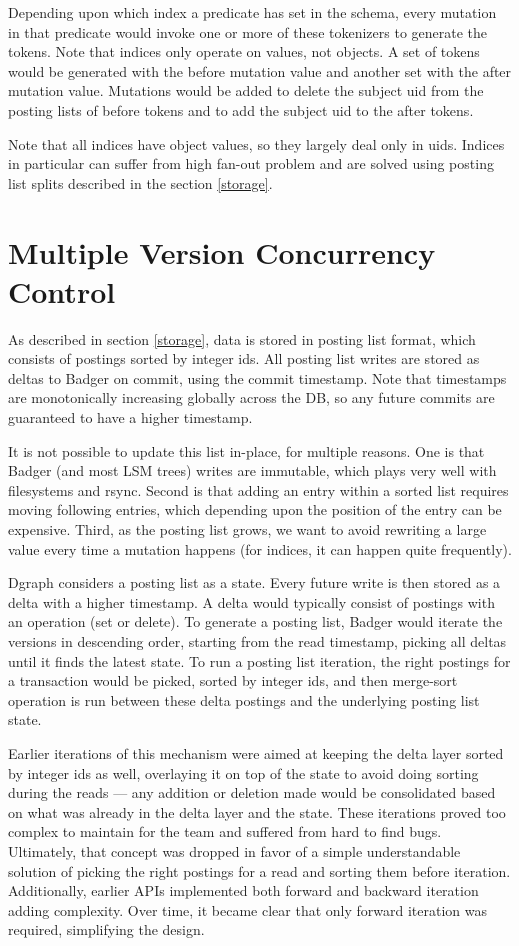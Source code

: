 \documentclass[letterpaper,twocolumn,10pt]{article}
\begin{document}
Depending upon which index a predicate has set in the schema, every mutation in
that predicate would invoke one or more of these tokenizers to generate the
tokens. Note that indices only operate on values, not objects. A set of
tokens would be generated with the before mutation value and another set
with the after mutation value. Mutations would be added to delete the
subject uid from the posting lists of before tokens and to add the subject
uid to the after tokens.

Note that all indices have object values, so they largely deal only in uids.
Indices in particular can suffer from high fan-out problem and are solved using
posting list splits described in the section \ref{storage}.

\section{Multiple Version Concurrency Control}

As described in section \ref{storage}, data is stored in posting list format,
which consists of postings sorted by integer ids.  All posting list writes are
stored as deltas to Badger on commit, using the commit timestamp. Note that
timestamps are monotonically increasing globally across the DB, so any future
commits are guaranteed to have a higher timestamp.

It is not possible to update this list in-place, for multiple reasons. One is
that Badger (and most LSM trees) writes are immutable, which plays very well
with filesystems and rsync.  Second is that adding an entry within a sorted list
requires moving following entries, which depending upon the position of the
entry can be expensive. Third, as the posting list grows, we want to avoid
rewriting a large value every time a mutation happens (for indices, it can
happen quite frequently).

Dgraph considers a posting list as a state. Every future write is then
stored as a delta with a higher timestamp. A delta would typically consist of
postings with an operation (set or delete). To generate a posting list, Badger
would iterate the versions in descending order, starting from the read
timestamp, picking all deltas until it finds the latest state.  To run a posting
list iteration, the right postings for a transaction would be picked, sorted by
integer ids, and then merge-sort operation is run between these delta postings
and the underlying posting list state.

Earlier iterations of this mechanism were aimed at keeping the delta layer
sorted by integer ids as well, overlaying it on top of the state to avoid doing
sorting during the reads --- any addition or deletion made would be consolidated
based on what was already in the delta layer and the state. These iterations
proved too complex to maintain for the team and suffered from hard to find bugs.
Ultimately, that concept was dropped in favor of a simple understandable
solution of picking the right postings for a read and sorting them before
iteration. Additionally, earlier APIs implemented both forward and backward
iteration adding complexity. Over time, it became clear that only forward
iteration was required, simplifying the design.
\end{document}
